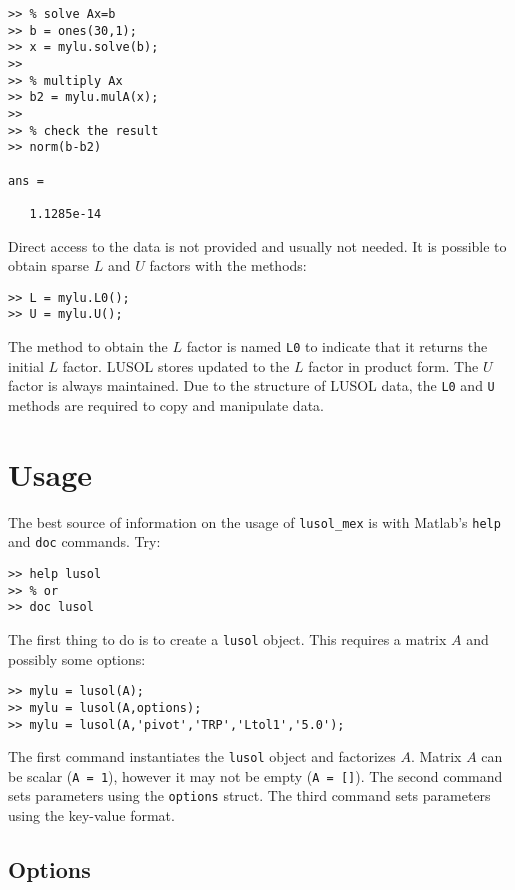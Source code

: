 \documentclass[11pt]{article}
\newcommand{\lmex}{\texttt{lusol\_mex}\xspace}
\begin{document}
\begin{verbatim}
>> % solve Ax=b
>> b = ones(30,1);
>> x = mylu.solve(b);
>>
>> % multiply Ax
>> b2 = mylu.mulA(x);
>>
>> % check the result
>> norm(b-b2)

ans =

   1.1285e-14
\end{verbatim}

Direct access to the data is not provided and usually not needed.  It
is possible to obtain sparse $L$ and $U$ factors with the methods:

\begin{verbatim}
>> L = mylu.L0();
>> U = mylu.U();
\end{verbatim}

The method to obtain the $L$ factor is named \texttt{L0} to indicate
that it returns the initial $L$ factor.  LUSOL stores updated to the
$L$ factor in product form.  The $U$ factor is always maintained.  Due
to the structure of LUSOL data, the \texttt{L0} and \texttt{U} methods
are required to copy and manipulate data.

\section{Usage}

The best source of information on the usage of \lmex is with Matlab's
\texttt{help} and \texttt{doc} commands.  Try:

\begin{verbatim}
>> help lusol
>> % or
>> doc lusol
\end{verbatim}

The first thing to do is to create a \texttt{lusol} object.  This
requires a matrix $A$ and possibly some options:

\begin{verbatim}
>> mylu = lusol(A);
>> mylu = lusol(A,options);
>> mylu = lusol(A,'pivot','TRP','Ltol1','5.0');
\end{verbatim}

The first command instantiates the \texttt{lusol} object and
factorizes $A$.  Matrix $A$ can be scalar (\texttt{A = 1}), however it
may not be empty (\texttt{A = []}).  The second command sets
parameters using the \texttt{options} struct.  The third command sets
parameters using the key-value format.

\subsection{Options}
\end{document}
